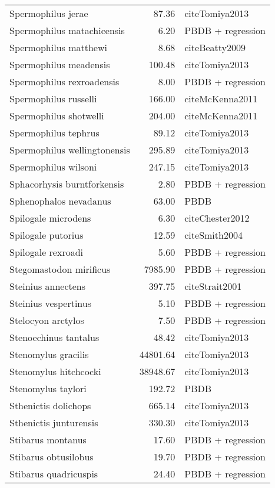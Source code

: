 \begin{table}[ht]
\begin{tabular}{lrl}
  Spermophilus jerae & 87.36 & cite{Tomiya2013} \\ 
  Spermophilus matachicensis & 6.20 & PBDB + regression \\ 
  Spermophilus matthewi & 8.68 & cite{Beatty2009} \\ 
  Spermophilus meadensis & 100.48 & cite{Tomiya2013} \\ 
  Spermophilus rexroadensis & 8.00 & PBDB + regression \\ 
  Spermophilus russelli & 166.00 & cite{McKenna2011} \\ 
  Spermophilus shotwelli & 204.00 & cite{McKenna2011} \\ 
  Spermophilus tephrus & 89.12 & cite{Tomiya2013} \\ 
  Spermophilus wellingtonensis & 295.89 & cite{Tomiya2013} \\ 
  Spermophilus wilsoni & 247.15 & cite{Tomiya2013} \\ 
  Sphacorhysis burntforkensis & 2.80 & PBDB + regression \\ 
  Sphenophalos nevadanus & 63.00 & PBDB \\ 
  Spilogale microdens & 6.30 & cite{Chester2012} \\ 
  Spilogale putorius & 12.59 & cite{Smith2004} \\ 
  Spilogale rexroadi & 5.60 & PBDB + regression \\ 
  Stegomastodon mirificus & 7985.90 & PBDB + regression \\ 
  Steinius annectens & 397.75 & cite{Strait2001} \\ 
  Steinius vespertinus & 5.10 & PBDB + regression \\ 
  Stelocyon arctylos & 7.50 & PBDB + regression \\ 
  Stenoechinus tantalus & 48.42 & cite{Tomiya2013} \\ 
  Stenomylus gracilis & 44801.64 & cite{Tomiya2013} \\ 
  Stenomylus hitchcocki & 38948.67 & cite{Tomiya2013} \\ 
  Stenomylus taylori & 192.72 & PBDB \\ 
  Sthenictis dolichops & 665.14 & cite{Tomiya2013} \\ 
  Sthenictis junturensis & 330.30 & cite{Tomiya2013} \\ 
  Stibarus montanus & 17.60 & PBDB + regression \\ 
  Stibarus obtusilobus & 19.70 & PBDB + regression \\ 
  Stibarus quadricuspis & 24.40 & PBDB + regression \\ 

\end{tabular}
\end{table}
